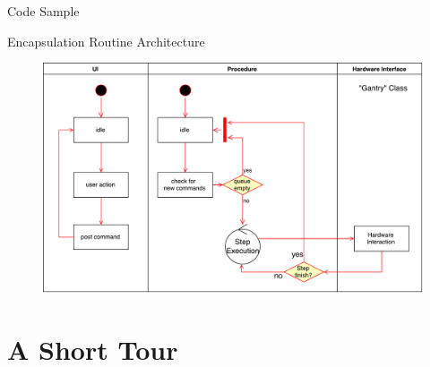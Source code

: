 \documentclass{beamer}
\begin{document}
\begin{frame}{Code Sample}
\begin{figure}
    \centering
    \label{fig:code_sample}
\end{figure}
\end{frame}

\begin{frame}{Encapsulation Routine Architecture}
\begin{figure}
    \centering
    \includegraphics[width=\textwidth]{"figures/Gantry Software Architecture"}
    \label{fig:gantry_software_architecture}
\end{figure}
\end{frame}

\section{A Short Tour}
\end{document}
